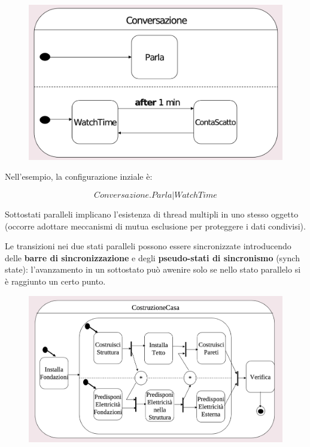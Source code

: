 \begin{figure}[h!]
    \centering
    \includegraphics[width=0.75\linewidth]{assets/UML/state/state8.png}
\end{figure}

Nell'esempio, la configurazione inziale è:

$$Conversazione.Parla|WatchTime$$ 

Sottostati paralleli implicano l'esistenza di thread multipli in uno stesso oggetto (occorre adottare meccanismi di mutua esclusione per proteggere i dati condivisi).

Le transizioni nei due stati paralleli possono essere sincronizzate introducendo delle \textbf{barre di sincronizzazione} e degli \textbf{pseudo-stati di sincronismo} (synch state): l'avanzamento in un sottostato può awenire solo se nello stato parallelo si è raggiunto un certo punto.

\begin{figure}[h!]
    \centering
    \includegraphics[width=0.75\linewidth]{assets/UML/state/state9.png}
\end{figure}

\newpage